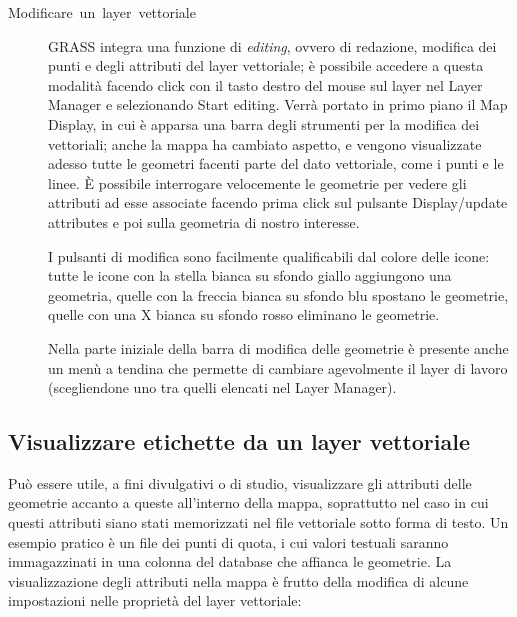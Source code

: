		\begin{description}
			\item [{Modificare~un~layer~vettoriale}] GRASS integra una funzione di \emph{editing}, ovvero di redazione, modifica dei punti e degli attributi del layer vettoriale; è possibile accedere a questa modalità facendo click con il tasto destro del mouse sul layer nel Layer Manager e selezionando \textsf{Start editing}. Verrà portato in primo piano il Map Display, in cui è apparsa una barra degli strumenti per la modifica dei vettoriali; anche la mappa ha cambiato aspetto, e vengono visualizzate adesso tutte le geometri facenti parte del dato vettoriale, come i punti e le linee. È possibile interrogare velocemente le geometrie per vedere gli attributi ad esse associate facendo prima click sul pulsante \textsf{Display/update attributes} e poi sulla geometria di nostro interesse.

			I pulsanti di modifica sono facilmente qualificabili dal colore delle icone: tutte le icone con la stella bianca su sfondo giallo aggiungono una geometria, quelle con la freccia bianca su sfondo blu spostano le geometrie, quelle con una X bianca su sfondo rosso eliminano le geometrie.

			Nella parte iniziale della barra di modifica delle geometrie è presente anche un menù a tendina che permette di cambiare agevolmente il layer di lavoro (scegliendone uno tra quelli elencati nel Layer Manager).
		\end{description}

	\subsection{Visualizzare etichette da un layer vettoriale}
		Può essere utile, a fini divulgativi o di studio, visualizzare gli attributi delle geometrie accanto a queste all'interno della mappa, soprattutto nel caso in cui questi attributi siano stati memorizzati nel file vettoriale sotto forma di testo. Un esempio pratico è un file dei punti di quota, i cui valori testuali saranno immagazzinati in una colonna del database che affianca le geometrie. La visualizzazione degli attributi nella mappa è frutto della modifica di alcune impostazioni nelle proprietà del layer vettoriale:
		
